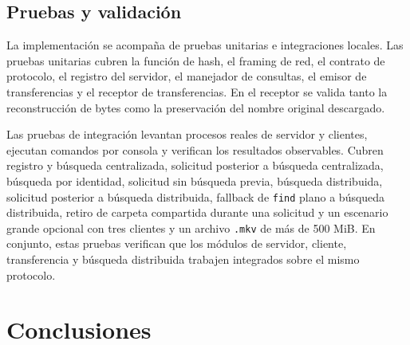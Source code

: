 \documentclass[12pt]{article}
\begin{document}
\subsection{Pruebas y validación}

La implementación se acompaña de pruebas unitarias e integraciones locales. Las
pruebas unitarias cubren la función de hash, el framing de red, el contrato de
protocolo, el registro del servidor, el manejador de consultas, el emisor de
transferencias y el receptor de transferencias. En el receptor se valida tanto
la reconstrucción de bytes como la preservación del nombre original descargado.

Las pruebas de integración levantan procesos reales de servidor y clientes,
ejecutan comandos por consola y verifican los resultados observables. Cubren
registro y búsqueda centralizada, solicitud posterior a búsqueda centralizada,
búsqueda por identidad, solicitud sin búsqueda previa, búsqueda distribuida,
solicitud posterior a búsqueda distribuida, fallback de \texttt{find} plano a
búsqueda distribuida, retiro de carpeta compartida durante una solicitud y un
escenario grande opcional con tres clientes y un archivo \texttt{.mkv} de más
de 500 MiB. En conjunto, estas pruebas verifican que los módulos de servidor,
cliente, transferencia y búsqueda distribuida trabajen integrados sobre el
mismo protocolo.

\newpage
\section{Conclusiones}
\end{document}

